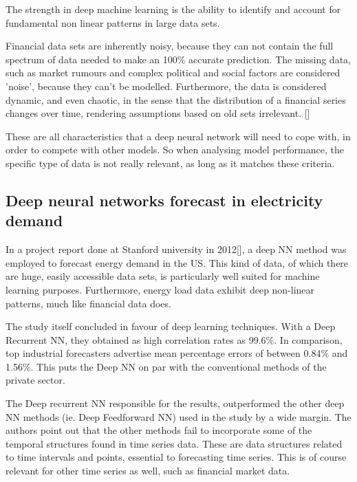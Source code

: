 The strength in deep machine learning is the ability to identify and account for fundamental non linear patterns in large data sets.

Financial data sets are inherently noisy, because they can not contain the full spectrum of data needed to make an 100\% accurate prediction. The missing data, such as market rumours and complex political and social factors are considered 'noise', because they can't be modelled. Furthermore, the data is considered dynamic, and even chaotic, in the sense that the distribution of a financial series changes over time, rendering assumptions based on old sets irrelevant. []

These are all characteristics that a deep neural network will need to cope with, in order to compete with other models. So when analysing model performance, the  specific type of data is not really relevant, as long as it matches these criteria.

\subsection{Deep neural networks forecast in electricity demand}


In a project report done at Stanford university in 2012[], a deep NN method was employed to forecast energy demand in the US. This kind of data, of which there are huge, easily accessible data sets, is particularly well suited for machine learning purposes. Furthermore, energy load data exhibit deep non-linear patterns, much like financial data does.

The study itself concluded in favour of deep learning techniques. With a Deep Recurrent NN, they obtained as high correlation rates as 99.6\%. In comparison, top industrial forecasters advertise mean percentage errors of between 0.84\% and 1.56\%. This puts the Deep NN on par with the conventional methods of the private sector.

The Deep recurrent NN responsible for the results, outperformed the other deep NN methods (ie. Deep Feedforward NN) used in the study by a wide margin. The authors point out that the other methods fail to incorporate some of the temporal structures found in time series data. These are data structures related to time intervals and points, essential to forecasting time series. This is of course relevant for other time series as well, such as financial market data.


